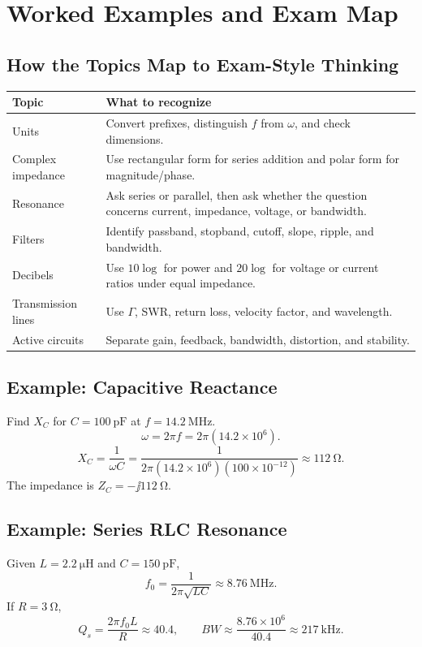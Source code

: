 \chapter{Worked Examples and Exam Map}
\section{How the Topics Map to Exam-Style Thinking}
\begin{tabularx}{\textwidth}{@{}L{0.24\textwidth}Y@{}}
\toprule
Topic & What to recognize \\
\midrule
Units & Convert prefixes, distinguish \(f\) from \(\omega\), and check dimensions. \\
Complex impedance & Use rectangular form for series addition and polar form for magnitude/phase. \\
Resonance & Ask series or parallel, then ask whether the question concerns current, impedance, voltage, or bandwidth. \\
Filters & Identify passband, stopband, cutoff, slope, ripple, and bandwidth. \\
Decibels & Use \(10\log\) for power and \(20\log\) for voltage or current ratios under equal impedance. \\
Transmission lines & Use \(\Gamma\), SWR, return loss, velocity factor, and wavelength. \\
Active circuits & Separate gain, feedback, bandwidth, distortion, and stability. \\
\bottomrule
\end{tabularx}

\section{Example: Capacitive Reactance}
Find \(X_C\) for \(C=\SI{100}{\pico\farad}\) at \(f=\SI{14.2}{\mega\hertz}\).
\[
\omega=2\pi f=2\pi(14.2\times10^6).
\]
\[
X_C=\frac{1}{\omega C}
=\frac{1}{2\pi(14.2\times10^6)(100\times10^{-12})}
\approx \SI{112}{\ohm}.
\]
The impedance is \(Z_C=-\jj\SI{112}{\ohm}\).

\section{Example: Series RLC Resonance}
Given \(L=\SI{2.2}{\micro\henry}\) and \(C=\SI{150}{\pico\farad}\),
\[
f_0=\frac{1}{2\pi\sqrt{LC}}
\approx \SI{8.76}{\mega\hertz}.
\]
If \(R=\SI{3}{\ohm}\),
\[
Q_s=\frac{2\pi f_0 L}{R}
\approx 40.4,
\qquad
BW\approx \frac{8.76\times10^6}{40.4}
\approx \SI{217}{\kilo\hertz}.
\]

